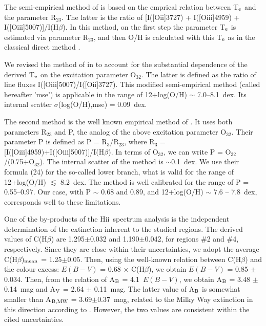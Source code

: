 \documentclass[useAMS,usenatbib]{mn2e}
\newcommand{\HII}{H{\sc ii}}
\begin{document}
The semi-empirical method of \citet{IT07} is based on the emprical relation between
T$_{\rm e}$ and the parameter R$_{\mathrm {23}}$. The latter is the ratio of
[I([O{\sc ii}]3727) + I([O{\sc iii}]4959) + I([O{\sc iii}]5007)]/I(H$\beta$).
In this method, on the first step the parameter T$_{\rm e}$ is estimated via parameter
R$_{\mathrm {23}}$, and then O/H is calculated with this T$_{\rm e}$ as in the classical
direct method \citep[e.g.][]{Izotov06}.

We revised the method of \citet{IT07} in \citet{XMP-BTA} to account for the substantial dependence of the derived
T$_{\rm e}$ on the excitation parameter O$_{\mathrm {32}}$. The latter is defined as the ratio of line fluxes
I([O{\sc iii}]5007)/I([O{\sc ii}]3727). This modified semi-empirical method (called hereafter 'mse') is applicable
in the range of 12+log(O/H) $\sim$ 7.0--8.1~dex. %
Its internal scatter $\sigma$(log(O/H),mse) = 0.09~dex.

The second method is the well known empirical method of \citet{PT05}. It uses both
parameters R$_{\mathrm {23}}$ and P, the analog of the above excitation parameter O$_{\mathrm {32}}$.
Their parameter P is defined as P = R$_{\mathrm {3}}$/R$_{\mathrm {23}}$, where
R$_{\mathrm {3}}$ = [I([O{\sc iii}]4959)+I([O{\sc iii}]5007)]/I(H$\beta$).
In terms of O$_{\mathrm {32}}$, we can write P = O$_{\mathrm {32}}$/(0.75+O$_{\mathrm {32}}$).
The internal scatter of the \citet{PT05} method is $\sim$0.1~dex.
We use their formula (24) for the so-called lower branch,  what is valid for the range
of 12+log(O/H) $\lesssim$ 8.2~dex. The method is well calibrated for the range of P = 0.55--0.97.
Our case, with P $\sim$ 0.68 and 0.89, and 12+log(O/H) $\sim$ 7.6 --  7.8~dex, corresponds well to these limitations.

One of the by-products of the \HII\ spectrum analysis is the independent
determination of the extinction inherent to the studied regions.
The derived values of C(H$\beta$) are 1.295$\pm$0.032 and 1.190$\pm$0.042, for regions $\#$2 and $\#$4, respectively.
Since they are close within their uncertainties, we adopt the average C(H$\beta$)$_{\rm mean}$ = 1.25$\pm$0.05.
Then, using the well-known relation between C(H$\beta$) and the colour excess:  $E(B-V)$ = 0.68 $\times$ C(H$\beta$),
we obtain $E(B-V)$ = 0.85 $\pm$ 0.034.
Then, from the relation of A$_{\rm B}$ = 4.1~$E(B-V)$, we obtain
A$_{\rm B}$ = 3.48 $\pm$ 0.14~mag and A$_{\rm V}$ = 2.64 $\pm$ 0.11~mag.
The latter value of A$_{\rm B}$ is somewhat smaller than A$_{\rm B, MW}$ = 3.69$\pm$0.37~mag, related to the Milky Way
extinction in this direction according to \citet{Schlafly11}. However, the two values are consistent within the cited
uncertainties.
\end{document}
